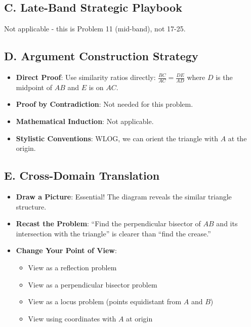 \documentclass[12pt]{article}
\begin{document}
\begin{strategicbox}
\subsection*{C. Late-Band Strategic Playbook}
Not applicable - this is Problem 11 (mid-band), not 17-25.

\subsection*{D. Argument Construction Strategy}
\begin{itemize}[leftmargin=*]
    \item \textbf{Direct Proof}: Use similarity ratios directly: $\frac{BC}{AC} = \frac{DE}{AD}$ where $D$ is the midpoint of $AB$ and $E$ is on $AC$.
    \item \textbf{Proof by Contradiction}: Not needed for this problem.
    \item \textbf{Mathematical Induction}: Not applicable.
    \item \textbf{Stylistic Conventions}: WLOG, we can orient the triangle with $A$ at the origin.
\end{itemize}

\subsection*{E. Cross-Domain Translation}
\begin{itemize}[leftmargin=*]
    \item \textbf{Draw a Picture}: Essential! The diagram reveals the similar triangle structure.
    \item \textbf{Recast the Problem}: ``Find the perpendicular bisector of $AB$ and its intersection with the triangle'' is clearer than ``find the crease.''
    \item \textbf{Change Your Point of View}: 
    \begin{itemize}
        \item View as a reflection problem
        \item View as a perpendicular bisector problem
        \item View as a locus problem (points equidistant from $A$ and $B$)
        \item View using coordinates with $A$ at origin
    \end{itemize}
\end{itemize}
\end{strategicbox}
\end{document}
